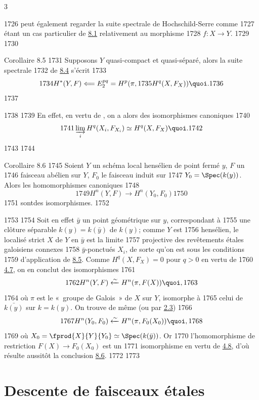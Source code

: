 3	\documentclass[10pt]{../fichiers-configuration-latex/smfart}
\begin{document}
  1726	peut également regarder la suite spectrale de Hochschild-Serre comme
  1727	étant un cas particulier de \hyperref[VIII.prop8.1]{8.1} relativement au morphisme
  1728	$f:X\rightarrow Y$.
  1729	
  1730	\begin{enonce*}{Corollaire 8.5}
  1731	Supposons $Y$ quasi-compact et quasi-séparé, alors la suite spectrale
  1732	de \hyperref[VIII.prop8.4]{8.4} s'écrit
  1733	$$
  1734	H^{\ast}(Y,F)\Longleftarrow E^{pq}_{2}=H^{p}(\pi,
  1735	H^{q}(X,F_{X})){\quoi}.
  1736	$$
  1737	\end{enonce*}
  1738	
  1739	En effet, en vertu de , on a alors des isomorphismes canoniques
  1740	$$
  1741	\varinjlim_{i} H^{q}(X_{i},F_{X_{i}})\simeq H^{q}(X,F_{X}){\quoi}.
  1742	$$
  1743	
  1744	\begin{enonce*}{Corollaire 8.6}
  1745	Soient $Y$ un schéma local hensélien de point fermé $y$, $F$ un
  1746	faisceau abélien sur $Y$, $F_{0}$ le faisceau induit sur
  1747	$Y_{0}=\Spec (k(y))$. Alors les homomorphismes canoniques
  1748	$$
  1749	H^{n}(Y,F)\longrightarrow H^{n}(Y_{0},F_{0})
  1750	$$
  1751	sont\pageoriginale  des isomorphismes.
  1752	\end{enonce*}
  1753	
  1754	Soit en effet $\bar{y}$ un point géométrique sur $y$, correspondant à
  1755	une clôture séparable $k(y)=k(\bar{y})$ de $k(y)$; comme $Y$ est
  1756	hensélien, le localisé strict $X$ de $Y$ en $\bar{y}$ est la limite
  1757	projective des revêtements étales galoisiens connexes
  1758	$\bar{y}$-ponctués $X_{i}$, de sorte qu'on est sous les conditions
  1759	d'application de \hyperref[VIII.cor8.5]{8.5}. Comme $H^{q}(X,F_{X})=0$ pour $q>0$ en vertu de
  1760	\hyperref[VIII.cor4.7]{4.7}, on en conclut des isomorphismes
  1761	$$
  1762	H^{n}(Y,F)\xleftarrow{\sim} H^{n}(\pi, F(X)){\quoi},
  1763	$$
  1764	où $\pi$ est le « groupe de Galois » de $X$ sur $Y$, isomorphe à
  1765	celui de $\bar{k(y)}$ sur $k=k(y)$. On trouve de même (ou par \hyperref[VIII.cor2.3]{2.3})
  1766	$$
  1767	H^{n}(Y_{0},F_{0})\xleftarrow{\sim} H^{n}(\pi,F_{0}(X_{0})){\quoi},
  1768	$$
  1769	où $X_{0}=\fprod{X}{Y}{Y_{0}}\simeq \Spec (k(\bar{y}))$. Or
  1770	l'homomorphisme de restriction $F(X)\rightarrow F_{0}(X_{0})$ est un
  1771	isomorphisme en vertu de \hyperref[VIII.cor4.8]{4.8}, d'où résulte aussitôt la conclusion \hyperref[VIII.cor8.6]{8.6}.
  1772	
  1773	\section{Descente de faisceaux étales}
\end{document}
